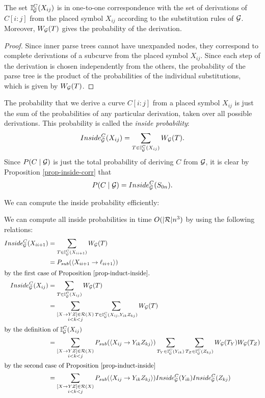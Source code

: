 \begin{prop}
\label{prop-inside-corr}
  The set $\mathbb{I}_{{\mathcal G}}^C(X_{ij})$ is in one-to-one correspondence with
  the set of derivations of $C[i:j]$ from the placed symbol $X_{ij}$
  according to the substitution rules of ${\mathcal G}$. Moreover, $W_{{\mathcal G}}(T)$
  gives the probability of the derivation.
\end{prop}
\begin{proof}
Since inner parse trees cannot have unexpanded nodes, they correspond
to complete derivations of a subcurve from the placed symbol
$X_{ij}$. Since each step of the derivation is chosen independently
from the others, the probability of the parse tree is the product of
the probabilities of the individual substitutions, which is given by $W_{{\mathcal G}}(T)$.
\end{proof}

The probability that we derive a curve $C[i:j]$ from a placed symbol
$X_{ij}$ is just the sum of the probabilities of any particular
derivation, taken over all possible derivations. This probability is
called the \emph{inside probability}:
$$Inside_{{\mathcal G}}^C(X_{i j}) =  \sum_{T\in \mathbb{I}_{{\mathcal G}}^C(X_{ij})}W_{{\mathcal G}}(T).$$
Since $P(C\mid {\mathcal G})$ is just the total probability of deriving $C$
from ${\mathcal G}$, it is clear by Proposition \ref{prop-inside-corr} that 
$$P(C\mid {\mathcal G}) = Inside_{{\mathcal G}}^C(S_{0 n}).$$

We can compute the inside probability efficiently:

\begin{obs}
\label{obs-inside-rec}
We can compute all inside probabilities in time $O(|{\mathcal R}|n^3)$ by using the
following relations:
  \begin{align*}
Inside_{{\mathcal G}}^C(X_{i i+1}) &= \sum_{T\in \mathbb{I}_{{\mathcal G}}^C(X_{i i+1})}
W_{{\mathcal G}}(T)\\
 &= P_{sub}(\langle X_{i i+1} \to \ell_{i i+1} \rangle) \\
\intertext{by the first case of Proposition \ref{prop-induct-inside}.}
Inside_{{\mathcal G}}^C(X_{ij}) &= \sum_{T\in \mathbb{I}_{{\mathcal G}}^C(X_{ij})} W_{{\mathcal G}}(T)\\
&= \sum_{\substack{[X\to YZ] \in {\mathcal R}(X)\\ i < k < j}} \sum_{T\in
  \mathbb{I}_{{\mathcal G}}^C(X_{ij}, Y_{ik}Z_{kj})} W_{{\mathcal G}}(T)\\
\intertext{by the definition of $\mathbb{I}_{{\mathcal G}}^C(X_{ij})$}
&= \sum_{\substack{[X\to YZ] \in {\mathcal R}(X)\\ i < k < j}} 
P_{sub}(\langle X_{ij} \to Y_{ik} Z_{kj} \rangle)
\sum_{T_Y\in \mathbb{I}_{{\mathcal G}}^C(Y_{ik})}
\sum_{T_Z\in \mathbb{I}_{{\mathcal G}}^C(Z_{kj})}
 W_{{\mathcal G}}(T_Y) W_{{\mathcal G}}(T_Z)\\
\intertext{by the second case of Proposition \ref{prop-induct-inside}}
&= \sum_{\substack{[X\to YZ] \in {\mathcal R}(X)\\ i < k < j}} 
P_{sub}(\langle  X_{ij} \to Y_{ik} Z_{kj} \rangle)
Inside_{{\mathcal G}}^C(Y_{ik})
Inside_{{\mathcal G}}^C(Z_{kj})
  \end{align*}
\end{obs}

